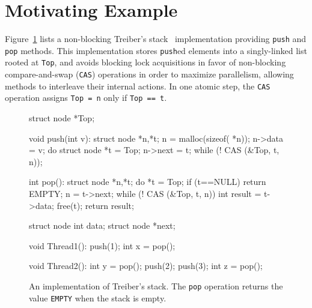 
\section{Motivating Example}
\label{sec:motivation}

Figure~\ref{fig:treiber} lists a non-blocking Treiber's stack~\cite{Treiber'86}
implementation providing {\tt push} and {\tt pop} methods. This implementation
stores {\tt push}ed elements into a singly-linked list rooted at {\tt Top}, and
avoids blocking lock acquisitions in favor of non-blocking compare-and-swap
({\tt CAS}) operations in order to maximize parallelism, allowing methods to
interleave their internal actions. In one atomic step, the {\tt CAS} operation
assigns {\tt Top = n} only if {\tt Top == t}.


\begin{figure}[t]
  \scriptsize
  \begin{minipage}[t]{41mm}
    \begin{program}
struct node *Top;      
      
void push(int v):
  struct node *n,*t;
  n = malloc(sizeof( *n));
  n->data = v;
  do {
    struct node *t = Top;
    n->next = t;
  } while (! CAS (&Top, t, n));
    \end{program}
  \end{minipage}
  \begin{minipage}[t]{40mm}
    \begin{program}
int pop():
  struct node *n,*t;
  do {
    *t = Top;
    if (t==NULL) return EMPTY;
    n = t->next;
  } while (! CAS (&Top, t, n))
  int result = t->data;
  free(t);
  return result;
    \end{program}
  \end{minipage}
  \begin{minipage}[t]{30mm}
    \begin{program}
struct node {
  int data;
  struct node *next;
}
    \end{program}
  \end{minipage}
  \begin{minipage}[t]{25mm}
    \begin{program}
void Thread1():
  push(1);
  int x = pop();
    \end{program}
  \end{minipage}
  \begin{minipage}[t]{25mm}
    \begin{program}
void Thread2():
  int y = pop();
  push(2);
  push(3);
  int z = pop();
    \end{program}
  \end{minipage}
  \caption{An implementation of Treiber's stack. The {\tt pop} operation
  returns the value {\tt EMPTY} when the stack is empty.}
  \label{fig:treiber}
\end{figure}

